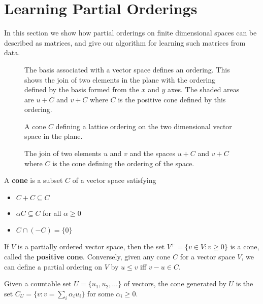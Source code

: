 \section{Learning Partial Orderings}

In this section we show how partial orderings on finite dimensional
spaces can be described as matrices, and give our algorithm for
learning such matrices from data.

\begin{figure}
\begin{center}
\scalebox{0.7}{

}
\caption{The basis associated with a vector space defines an
  ordering. This shows the join of two elements in the plane with the
  ordering defined by the basis formed from the $x$ and $y$ axes. The
  shaded areas are $u + C$ and $v + C$ where $C$ is the positive cone
  defined by this ordering. }
\end{center}
\end{figure}

\begin{figure}
\begin{center}
\scalebox{0.7}{

}
\end{center}
\caption{A cone $C$ defining a lattice ordering on the two dimensional
  vector space in the plane.}
\end{figure}

\begin{figure}
\begin{center}
\scalebox{0.7}{

}
\end{center}
\caption{The join of two elements $u$ and $v$ and the spaces $u + C$
  and $v + C$ where $C$ is the cone defining the ordering of the
  space.}
\end{figure}

A \textbf{cone} is a subset $C$ of a vector space satisfying
\begin{itemize}
\item $C + C \subseteq C$
\item $\alpha C \subseteq C$ for all $\alpha \ge 0$
\item $C \cap (-C) = \{0\}$
\end{itemize}
If $V$ is a partially ordered vector space, then the set $V^+ = \{v
\in V : v \ge 0\}$ is a cone, called the \textbf{positive
  cone}. Conversely, given any cone $C$ for a vector space $V$, we can
define a partial ordering on $V$ by $u \le v$ iff $v - u \in C$.

Given a countable set $U = \{u_1, u_2, \ldots\}$ of vectors, the cone
generated by $U$ is the set $C_U = \{v : v = \sum_i \alpha_i u_i\}$ for
some $\alpha_i \ge 0$.

